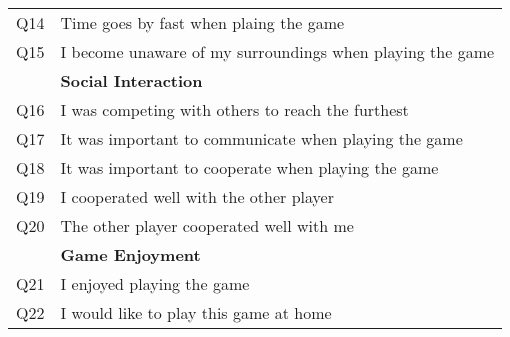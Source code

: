 \begin{table}[]
\begin{tabular}{|l|l|}
		Q14         & Time goes by fast when plaing the game                         \\
		Q15         & I become unaware of my surroundings when playing the game      \\ \hline
					& \textbf{Social Interaction}                                    \\ \hline
		Q16         & I was competing with others to reach the furthest              \\
		Q17         & It was important to communicate when playing the game          \\
		Q18         & It was important to cooperate when playing the game            \\
		Q19         & I cooperated well with the other player                        \\
		Q20         & The other player cooperated well with me                       \\ \hline
					& \textbf{Game Enjoyment}                                        \\ \hline
		Q21         & I enjoyed playing the game                                     \\
		Q22         & I would like to play this game at home                         \\ \hline
	\end{tabular}
\end{table}
